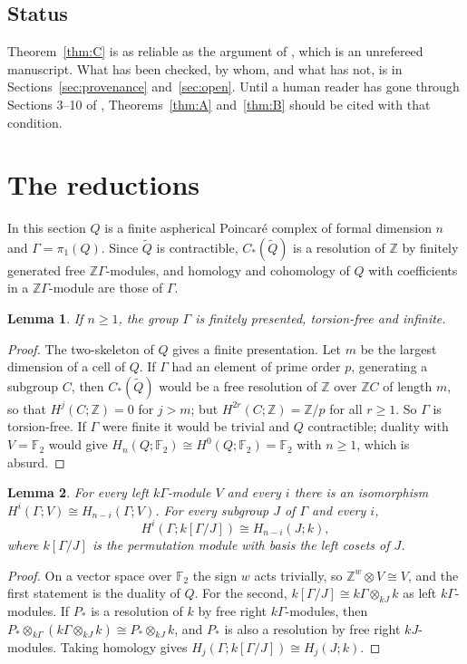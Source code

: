 \documentclass[11pt,a4paper]{article}
\newtheorem{lemma}{Lemma}[section]
\theoremstyle{definition}
\theoremstyle{remark}
\newcommand{\Z}{\mathbb{Z}}
\newcommand{\F}{\mathbb{F}}
\newcommand{\Gam}{\Gamma}
\begin{document}
\subsection{Status}
Theorem~\ref{thm:C} is as reliable as the argument of \cite{O}, which is an
unrefereed manuscript. What has been checked, by whom,
and what has not, is in Sections~\ref{sec:provenance} and~\ref{sec:open}. Until a human
reader has gone through Sections 3--10 of \cite{O},
Theorems~\ref{thm:A} and~\ref{thm:B} should be cited with that condition.

\section{The reductions}\label{sec:reductions}

In this section $Q$ is a finite aspherical Poincar\'e complex of formal dimension
$n$ and $\Gam=\pi_1(Q)$. Since $\widetilde Q$ is contractible, $C_*(\widetilde Q)$ is
a resolution of $\Z$ by finitely generated free $\Z\Gam$-modules, and homology and
cohomology of $Q$ with coefficients in a $\Z\Gam$-module are those of $\Gam$.

\begin{lemma}\label{lem:finiteness}
If $n\ge1$, the group $\Gam$ is finitely presented, torsion-free and infinite.
\end{lemma}
\begin{proof}
The two-skeleton of $Q$ gives a finite presentation. Let $m$ be the largest
dimension of a cell of $Q$. If $\Gam$ had an element of prime order $p$, generating
a subgroup $C$, then $C_*(\widetilde Q)$ would be a free resolution of $\Z$ over
$\Z C$ of length $m$, so that $H^j(C;\Z)=0$ for $j>m$; but $H^{2r}(C;\Z)=\Z/p$ for
all $r\ge1$. So $\Gam$ is torsion-free. If $\Gam$ were finite it would be trivial and
$Q$ contractible; duality with $V=\F_2$ would give
$H_n(Q;\F_2)\cong H^0(Q;\F_2)=\F_2$ with $n\ge1$, which is absurd.
\end{proof}

\begin{lemma}\label{lem:duality}
For every left $k\Gam$-module $V$ and every $i$ there is an isomorphism
$H^i(\Gam;V)\cong H_{n-i}(\Gam;V)$. For every subgroup $J$ of $\Gam$ and every $i$,
\[
 H^i(\Gam;k[\Gam/J])\cong H_{n-i}(J;k),
\]
where $k[\Gam/J]$ is the permutation module with basis the left cosets of $J$.
\end{lemma}
\begin{proof}
On a vector space over $\F_2$ the sign $w$ acts trivially, so
$\Z^w\otimes V\cong V$, and the first statement is the duality of $Q$. For the
second, $k[\Gam/J]\cong k\Gam\otimes_{kJ}k$ as left $k\Gam$-modules. If $P_*$ is a
resolution of $k$ by free right $k\Gam$-modules, then
$P_*\otimes_{k\Gam}(k\Gam\otimes_{kJ}k)\cong P_*\otimes_{kJ}k$, and $P_*$ is also a
resolution by free right $kJ$-modules. Taking homology gives
$H_j(\Gam;k[\Gam/J])\cong H_j(J;k)$.
\end{proof}
\end{document}
